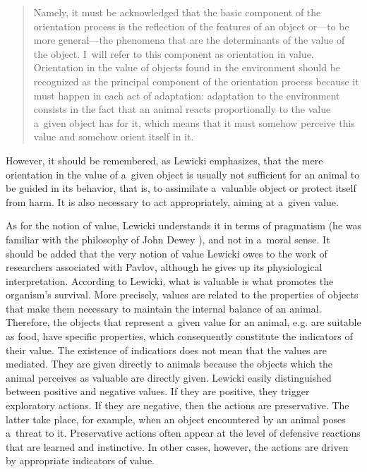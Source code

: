 \documentclass[%
manuscript=article,
year=2024,
volume=77,
doi=00000.000,
]{zfn}
\begin{document}
\begin{quote}
Namely, it must be acknowledged that the basic component of the orientation process is the reflection of the features of an object or---to be more general---the phenomena that are the determinants of the value of the object. I~will refer to this component as orientation in value. Orientation in the value of objects found in the environment should be recognized as the principal component of the orientation process because it must happen in each act of adaptation: adaptation to the environment consists in the fact that an animal reacts proportionally to the value a~given object has for it, which means that it must somehow perceive this value and somehow orient itself in it. 
\parencite[][p.48]{lewicki_cognition_2016}%
\end{quote}




However, it should be remembered, as Lewicki emphasizes, that the mere orientation in the value of a~given object is usually not sufficient for an animal to be guided in its behavior, that is, to assimilate a~valuable object or protect itself from harm. It is also necessary to act appropriately, aiming at a~given value.



As for the notion of value, Lewicki understands it in terms of pragmatism (he was familiar with the philosophy of John Dewey 
\parencite[cf.][p.234]{lewicki_procesy_1960}%
), and not in a~moral sense. It should be added that the very notion of value Lewicki owes to the work of researchers associated with Pavlov, although he gives up its physiological interpretation. According to Lewicki, what is valuable is what promotes the organism's survival. More precisely, values are related to the properties of objects that make them necessary to maintain the internal balance of an animal. Therefore, the objects that represent a~given value for an animal, e.g. are suitable as food, have specific properties, which consequently constitute the indicators of their value. The existence of indicatiors does not mean that the values are mediated. They are given directly to animals because the objects which the animal perceives as valuable are directly given. Lewicki easily distinguished between positive and negative values. If they are positive, they trigger exploratory actions. If they are negative, then the actions are preservative. The latter take place, for example, when an object encountered by an animal poses a~threat to it. Preservative actions often appear at the level of defensive reactions that are learned and instinctive. In other cases, however, the actions are driven by appropriate indicators of value.
\end{document}
